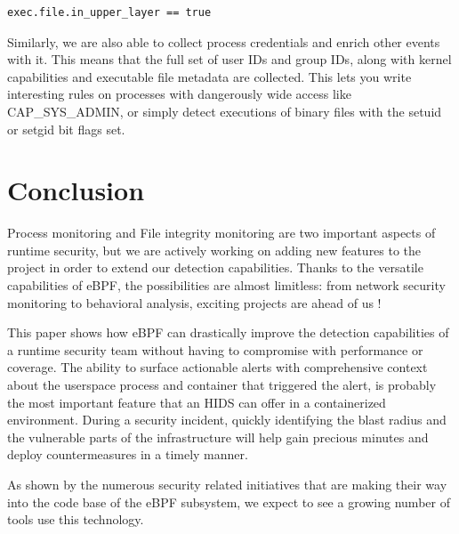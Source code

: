 \begin{lstlisting}[language={},caption={In upper layer rule example},label={lst:RuntimeSecurityMonitoringWithEBPF:UppoerLayerRule}]
exec.file.in_upper_layer == true
\end{lstlisting}

Similarly, we are also able to collect process credentials and enrich other events with it.
This means that the full set of user IDs and group IDs, along with kernel capabilities and executable file metadata are collected.
This lets you write interesting rules on processes with dangerously wide access like CAP\_SYS\_ADMIN, or simply detect executions of binary files with the setuid or setgid bit flags set.

\section{Conclusion}

Process monitoring and File integrity monitoring are two important aspects of runtime security, but we are actively working on adding new features to the project in order to extend our detection capabilities.
Thanks to the versatile capabilities of eBPF, the possibilities are almost limitless: from network security monitoring to behavioral analysis, exciting projects are ahead of us !

This paper shows how eBPF can drastically improve the detection capabilities of a runtime security team without having to compromise with performance or coverage.
The ability to surface actionable alerts with comprehensive context about the userspace process and container that triggered the alert, is probably the most important feature that an HIDS can offer in a containerized environment.
During a security incident, quickly identifying the blast radius and the vulnerable parts of the infrastructure will help gain precious minutes and deploy countermeasures in a timely manner.

As shown by the numerous security related initiatives that are making their way into the code base of the eBPF subsystem, we expect to see a growing number of tools use this technology.



%
%
